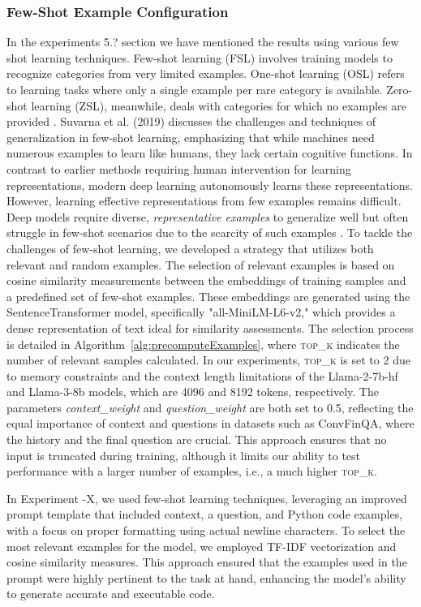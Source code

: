 \documentclass[logo,msc]{infthesis}           %
\begin{document}
\subsubsection*{Few-Shot Example Configuration}
In the experiments 5.? section we have mentioned the results using various few shot learning techniques. Few-shot learning (FSL) involves training models to recognize categories from very limited examples. One-shot learning (OSL) refers to learning tasks where only a single example per rare category is available. Zero-shot learning (ZSL), meanwhile, deals with categories for which no examples are provided \cite{billion2024low}. Suvarna et al. (2019) discusses the challenges and techniques of generalization in few-shot learning, emphasizing that while machines need numerous examples to learn like humans, they lack certain cognitive functions. In contrast to earlier methods requiring human intervention for learning representations, modern deep learning autonomously learns these representations. However, learning effective representations from few examples remains difficult. Deep models require diverse, \textit{representative examples} to generalize well but often struggle in few-shot scenarios due to the scarcity of such examples \cite{kadam2020review}.
To tackle the challenges of few-shot learning, we developed a strategy that utilizes both relevant and random examples. The selection of relevant examples is based on cosine similarity measurements between the embeddings of training samples and a predefined set of few-shot examples. These embeddings are generated using the SentenceTransformer model, specifically "all-MiniLM-L6-v2," which provides a dense representation of text ideal for similarity assessments. The selection process is detailed in Algorithm~\ref{alg:precomputeExamples}, where \textsc{top\_k} indicates the number of relevant samples calculated. In our experiments, \textsc{top\_k} is set to 2 due to memory constraints and the context length limitations of the Llama-2-7b-hf and Llama-3-8b models, which are 4096 and 8192 tokens, respectively. The parameters \textit{context\_weight} and \textit{question\_weight} are both set to 0.5, reflecting the equal importance of context and questions in datasets such as ConvFinQA, where the history and the final question are crucial. This approach ensures that no input is truncated during training, although it limits our ability to test performance with a larger number of examples, i.e., a much higher \textsc{top\_k}.

In Experiment -X, we used few-shot learning techniques, leveraging an improved prompt template that included context, a question, and Python code examples, with a focus on proper formatting using actual newline characters.
To select the most relevant examples for the model, we employed TF-IDF vectorization and cosine similarity measures. This approach ensured that the examples used in the prompt were highly pertinent to the task at hand, enhancing the model's ability to generate accurate and executable code.
\end{document}
